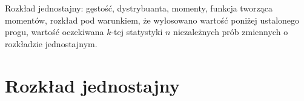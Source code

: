 {
\makeatletter
{}
\makeatother
\graphicspath{{../probabil}}

\begin{questiontext}
	Rozkład jednostajny: gęstość, dystrybuanta, momenty, funkcja tworząca momentów, rozkład pod warunkiem, że wylosowano wartość poniżej ustalonego progu, wartość oczekiwana \(k\)-tej statystyki \(n\) niezależnych prób zmiennych o rozkładzie jednostajnym.
\end{questiontext}

\section{Rozkład jednostajny}
 {
 }
}
